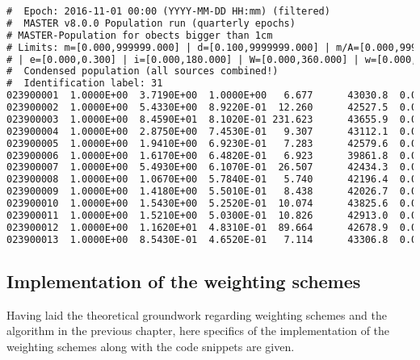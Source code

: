 \begin{lstlisting}[basicstyle=\ttfamily\footnotesize, language=TeX, caption={An excerpt from the input file ''telescope\_geo.sim''}]
#  Epoch: 2016-11-01 00:00 (YYYY-MM-DD HH:mm) (filtered) 
#  MASTER v8.0.0 Population run (quarterly epochs) 
# MASTER-Population for obects bigger than 1cm 
# Limits: m=[0.000,999999.000] | d=[0.100,9999999.000] | m/A=[0.000,999999.000] | a=[39000.000,46000.000] 
# | e=[0.000,0.300] | i=[0.000,180.000] | W=[0.000,360.000] | w=[0.000,360.000] | M=[0.000,360.000] 
#  Condensed population (all sources combined!) 
#  Identification label: 31 
023900001  1.0000E+00  3.7190E+00  1.0000E+00   6.677      43030.8  0.0264    7.07   305.83   296.63   140.04
023900002  1.0000E+00  5.4330E+00  8.9220E-01  12.260      42527.5  0.0266    6.82   305.58   135.89    48.28
023900003  1.0000E+00  8.4590E+01  8.1020E-01 231.623      43655.9  0.0167    7.31   306.18    37.53   290.20
023900004  1.0000E+00  2.8750E+00  7.4530E-01   9.307      43112.1  0.0083    7.35   305.58    84.91   205.82
023900005  1.0000E+00  1.9410E+00  6.9230E-01   7.283      42579.6  0.0179    7.49   304.85   142.65   182.04
023900006  1.0000E+00  1.6170E+00  6.4820E-01   6.923      39861.8  0.0996    5.97   303.03   171.76   326.80
023900007  1.0000E+00  5.4930E+00  6.1070E-01  26.507      42434.3  0.0141    6.49   305.91   169.25   321.50
023900008  1.0000E+00  1.0670E+00  5.7840E-01   5.740      42196.4  0.0358    7.30   304.61   146.20   239.77
023900009  1.0000E+00  1.4180E+00  5.5010E-01   8.438      42026.7  0.0252    7.19   304.53   173.28   241.35
023900010  1.0000E+00  1.5430E+00  5.2520E-01  10.074      43825.6  0.0227    6.62   307.25    50.89   325.63
023900011  1.0000E+00  1.5210E+00  5.0300E-01  10.826      42913.0  0.0173    7.85   304.84   116.90   156.32
023900012  1.0000E+00  1.1620E+01  4.8310E-01  89.664      42678.9  0.0116    7.36   305.10   145.15   161.47
023900013  1.0000E+00  8.5430E-01  4.6520E-01   7.114      43306.8  0.0233    6.50   306.89    92.02   291.45
\end{lstlisting}


\subsection{Implementation of the weighting schemes}

Having laid the theoretical groundwork regarding weighting schemes and the algorithm in the previous chapter, here specifics of the implementation of the weighting schemes along with the code snippets are given. 

